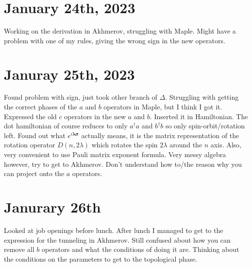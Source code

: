 \documentclass{article}
\begin{document}
\section*{January 24th, 2023}
Working on the derivation in Akhmerov, struggling with Maple. Might have a problem with one of my rules, giving the wrong sign in the new operators.
\section*{Januray 25th, 2023}
Found problem with sign, just took other branch of $\Delta$. Struggling with getting the correct phases of the $a$ and $b$ operators in Maple, but I think I got it. Expressed the old $c$ operators in the new $a$ and $b$. Inserted it in Hamiltonian. The dot hamiltonian of course reduces to only $a^\dag a$ and $b^\dag b$ so only spin-orbit/rotation left. Found out what $e^{i\boldsymbol{\lambda}\boldsymbol{\sigma}}$ actually means, it is the matrix representation of the rotation operator $D(n,2\lambda)$ which rotates the spin $2\lambda$ around the $n$ axis. Also, very convenient to use Pauli matrix exponent formula. Very messy algebra however, try to get to Akhmerov. Don't understand how to/the reason why you can project onto the $a$ operators.

\section*{Janurary 26th}
Looked at job openings before lunch. After lunch I managed to get to the expression for the tunneling in Akhmerov. Still confused about how you can remove all $b$ operators and what the conditions of doing it are. Thinking about the conditions on the parameters to get to the topological phase.
\end{document}
